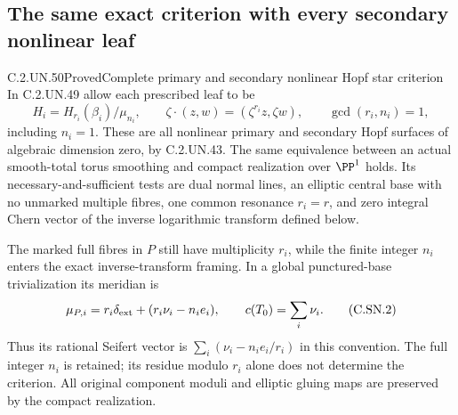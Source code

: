 \subsection{The same exact criterion with every secondary nonlinear leaf}

\begin{statement}{C.2.UN.50}{Proved}{Complete primary and secondary nonlinear Hopf star criterion}
In C.2.UN.49 allow each prescribed leaf to be
\[
 H_i=H_{r_i}(\beta_i)/\mu_{n_i},\qquad
 \zeta\cdot(z,w)=(\zeta^{r_i}z,\zeta w),\qquad
                         \gcd(r_i,n_i)=1,               \tag{C.SN.1}
\]
including $n_i=1$. These are all nonlinear primary and
secondary Hopf surfaces of algebraic dimension zero,
by C.2.UN.43. The same equivalence between an actual
smooth-total torus smoothing and compact realization
over $\PP^1$ holds. Its necessary-and-sufficient tests
are dual normal lines, an elliptic central base with
no unmarked multiple fibres, one common resonance
$r_i=r$, and zero integral Chern vector of the
inverse logarithmic transform defined below.

The marked full fibres in $P$ still have multiplicity
$r_i$, while the finite integer $n_i$ enters the
exact inverse-transform framing. In a global
punctured-base trivialization its meridian is
\[
       \mu_{P,i}=r_i\delta_{\rm ext}
                         +(r_i\nu_i-n_i e_i),\qquad
                         c(T_0)=\sum_i\nu_i.             \tag{C.SN.2}
\]
Thus its rational Seifert vector is
$\sum_i(\nu_i-n_i e_i/r_i)$ in this convention.
The full integer $n_i$ is retained; its residue
modulo $r_i$ alone does not determine the criterion.
All original component moduli and elliptic gluing
maps are preserved by the compact realization.
\end{statement}

